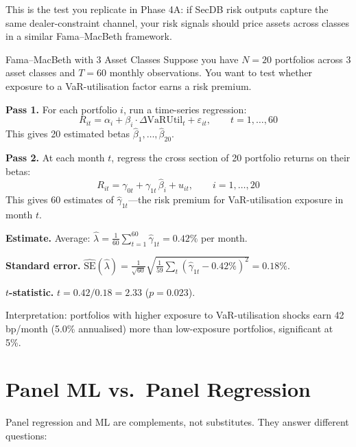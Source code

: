 This is the test you replicate in Phase 4A: if SecDB risk outputs capture the same dealer-constraint channel, your risk signals should price assets across classes in a similar Fama--MacBeth framework.

\begin{workedexample}{Fama--MacBeth with 3 Asset Classes}
Suppose you have $N = 20$ portfolios across 3 asset classes and $T = 60$ monthly observations.
You want to test whether exposure to a VaR-utilisation factor earns a risk premium.

\textbf{Pass 1.} For each portfolio $i$, run a time-series regression:
\[
  R_{it} = \alpha_i + \beta_i \cdot \Delta\text{VaRUtil}_t + \varepsilon_{it}, \qquad t = 1, \dots, 60
\]
This gives 20 estimated betas $\hat{\beta}_1, \dots, \hat{\beta}_{20}$.

\textbf{Pass 2.} At each month $t$, regress the cross section of 20 portfolio returns on their betas:
\[
  R_{it} = \gamma_{0t} + \gamma_{1t}\,\hat{\beta}_i + u_{it}, \qquad i = 1, \dots, 20
\]
This gives 60 estimates of $\hat{\gamma}_{1t}$---the risk premium for VaR-utilisation exposure in month $t$.

\textbf{Estimate.} Average: $\hat{\lambda} = \frac{1}{60}\sum_{t=1}^{60}\hat{\gamma}_{1t} = 0.42\%$ per month.

\textbf{Standard error.}
$\widehat{\text{SE}}(\hat{\lambda}) = \frac{1}{\sqrt{60}}\sqrt{\frac{1}{59}\sum_t (\hat{\gamma}_{1t} - 0.42\%)^2} = 0.18\%$.

\textbf{$t$-statistic.} $t = 0.42 / 0.18 = 2.33$ ($p = 0.023$).

Interpretation: portfolios with higher exposure to VaR-utilisation shocks earn 42\,bp/month (5.0\% annualised) more than low-exposure portfolios, significant at 5\%.
\end{workedexample}

\section{Panel ML vs.\ Panel Regression}
\label{sec:panel-ml}

Panel regression and ML are complements, not substitutes.
They answer different questions:

